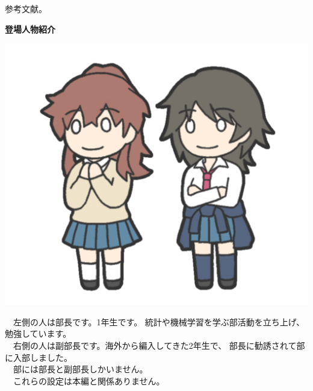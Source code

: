 \documentclass[b5paper,xelatex,ja=standard,11pt]{bxjsarticle}
\begin{document}
\begin{thebibliography}{9}
   参考文献。
\end{thebibliography}

\vspace{7pt}\centerline{\large\bf 登場人物紹介}
\vspace{-20pt}
\noindent
\begin{minipage}[t]{0.33\textwidth}
\centering
\strut\vspace*{-\baselineskip}
\newline\newline
\includegraphics[width=1.0\textwidth,keepaspectratio]{../images/ab.png}
\end{minipage}
\begin{minipage}[t]{0.67\textwidth}
\vspace{18pt}
　左側の人は部長です。1年生です。
統計や機械学習を学ぶ部活動を立ち上げ、勉強しています。\\
　右側の人は副部長です。海外から編入してきた2年生で、
部長に勧誘されて部に入部しました。\\
　部には部長と副部長しかいません。\\
　これらの設定は本編と関係ありません。
\end{minipage}

\begin{spacing}{1.1}\textbf{\tableofcontents}\end{spacing}
\end{document}
